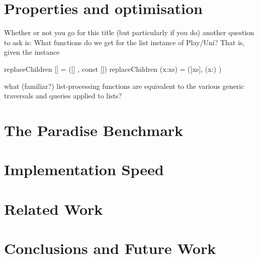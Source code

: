 \documentclass[preprint]{sigplanconf}
\begin{document}
\section{Properties and optimisation}

Whether or not you go for this title (but particularly if you do)
another question to ask is: What functions do we get for the list
instance of Play/Uni?  That is, given the instance

replaceChildren []     = ([]  , const [])
replaceChildren (x:xs) = ([xs], (x:)    )

what (familiar?) list-processing functions are equivalent to the
various generic traversals and queries applied to lists?




\section{The Paradise Benchmark}

\section{Implementation Speed}

\section{Related Work}

\section{Conclusions and Future Work}
\end{document}

